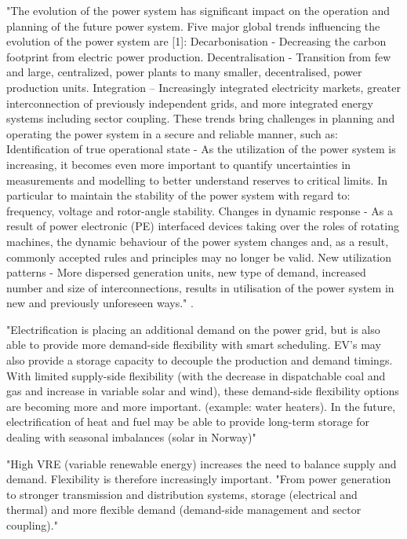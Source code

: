 "The evolution of the power system has significant impact on the operation and planning of the future power system. Five major global trends influencing the evolution of the power system are [1]: Decarbonisation - Decreasing the carbon footprint from electric power production. Decentralisation - Transition from few and large, centralized, power plants to many smaller, decentralised, power production units. Integration – Increasingly integrated electricity markets, greater interconnection of previously independent grids, and more integrated energy systems including sector coupling. These trends bring challenges in planning and operating the power system in a secure and reliable manner, such as: Identification of true operational state - As the utilization of the power system is increasing, it becomes even more important to quantify uncertainties in measurements and modelling to better understand reserves to critical limits. In particular to maintain the stability of the power system with regard to: frequency, voltage and rotor-angle stability. Changes in dynamic response - As a result of power electronic (PE) interfaced devices taking over the roles of rotating machines, the dynamic behaviour of the power system changes and, as a result, commonly accepted rules and principles may no longer be valid. New utilization patterns - More dispersed generation units, new type of demand, increased number and size of interconnections, results in utilisation of the power system in new and previously unforeseen ways." \cite{emil_hillberg_flexibility_2019}.

"Electrification is placing an additional demand on the power grid, but is also able to provide more demand-side flexibility with smart scheduling. EV's may also provide a storage capacity to decouple the production and demand timings. With limited supply-side flexibility (with the decrease in dispatchable coal and gas and increase in variable solar and wind), these demand-side flexibility options are becoming more and more important. (example: water heaters). In the future, electrification of heat and fuel may be able to provide long-term storage for dealing with seasonal imbalances (solar in Norway)" \cite{emanuele_taibi_power_2018}

"High VRE (variable renewable energy) increases the need to balance supply and demand. Flexibility is therefore increasingly important. "From power generation to stronger transmission and distribution systems, storage (electrical and thermal) and more flexible demand (demand-side management and sector coupling)." \cite{emanuele_taibi_power_2018}



